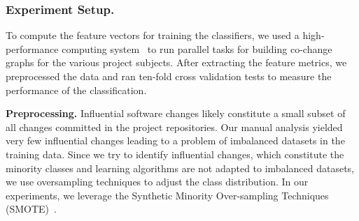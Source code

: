 
\subsubsection{Experiment Setup.}\label{sec:experiment}
To compute the feature vectors for training the classifiers, we used 
a high-performance computing system~\cite{VBCG_HPCS14} to run parallel tasks for
building co-change graphs for the various project subjects. After extracting the
feature metrics, we preprocessed the data and ran ten-fold cross validation
tests to measure the performance of the classification.

\textbf{Preprocessing.}
Influential software changes likely constitute a small subset of all changes
committed in the project repositories. Our manual analysis yielded very few
influential changes leading to a problem of imbalanced datasets in the training
data.
Since we try to identify influential changes, which constitute the minority
classes and learning algorithms are not adapted to imbalanced datasets, we use oversampling
techniques to adjust the class distribution. In our experiments, we leverage
the Synthetic Minority Over-sampling Techniques (SMOTE)~\cite{al.2002}.

